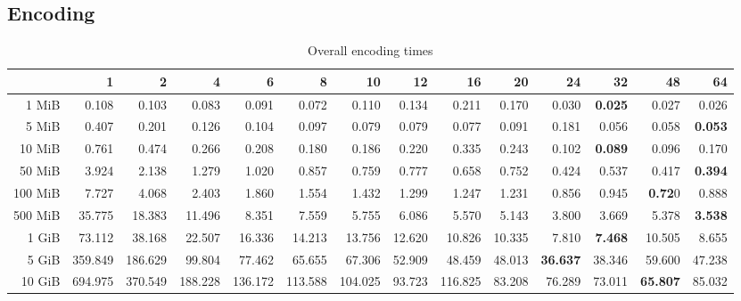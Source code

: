 
\subsection{Encoding}
\begin{table}[!h]
	\centering
	\caption{Overall encoding times}
	\begin{tabular}{rrrrrrrrrrrrrr}
		\toprule
		\diagbox[width=7em]{Size}{Threads} &      1  &      2  &      4  &      6  &      8  &      10 &     12 &      16 &     20 &     24 &     32 &     48 &     64 \\
		\midrule
		1 MiB   &   0.108 &   0.103 &   0.083 &   0.091 &   0.072 &   0.110 &  0.134 &   0.211 &  0.170 &  0.030 &  \textbf{0.025} &  0.027 &  0.026 \\
		5 MiB   &   0.407 &   0.201 &   0.126 &   0.104 &   0.097 &   0.079 &  0.079 &   0.077 &  0.091 &  0.181 &  0.056 &  0.058 &  \textbf{0.053} \\
		10 MiB  &   0.761 &   0.474 &   0.266 &   0.208 &   0.180 &   0.186 &  0.220 &   0.335 &  0.243 &  0.102 &  \textbf{0.089} &  0.096 &  0.170 \\
		50 MiB  &   3.924 &   2.138 &   1.279 &   1.020 &   0.857 &   0.759 &  0.777 &   0.658 &  0.752 &  0.424 &  0.537 &  0.417 &  \textbf{0.394} \\
		100 MiB &   7.727 &   4.068 &   2.403 &   1.860 &   1.554 &   1.432 &  1.299 &   1.247 &  1.231 &  0.856 &  0.945 &  \textbf{0.72}0 &  0.888 \\
		500 MiB &  35.775 &  18.383 &  11.496 &   8.351 &   7.559 &   5.755 &  6.086 &   5.570 &  5.143 &  3.800 &  3.669 &  5.378 &  \textbf{3.538} \\
		1 GiB   &  73.112 &  38.168 &  22.507 &  16.336 &  14.213 &  13.756 & 12.620 &  10.826 & 10.335 &  7.810 &  \textbf{7.468} & 10.505 &  8.655 \\
		5 GiB   & 359.849 & 186.629 &  99.804 &  77.462 &  65.655 &  67.306 & 52.909 &  48.459 & 48.013 & \textbf{36.637} & 38.346 & 59.600 & 47.238 \\
		10 GiB  & 694.975 & 370.549 & 188.228 & 136.172 & 113.588 & 104.025 & 93.723 & 116.825 & 83.208 & 76.289 & 73.011 & \textbf{65.807} & 85.032 \\
		\bottomrule
	\end{tabular}
\end{table}
